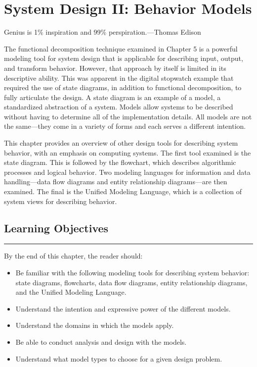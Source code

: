 \chapter{System Design II: Behavior Models}
\graphicspath{ {./chapter06/Fig} }

\begin{itquote}
Genius is 1\% inspiration and 99\% perspiration.---Thomas Edison
\end{itquote}


The functional decomposition technique examined in Chapter 5 is a
powerful modeling tool for system design that is applicable for
describing input, output, and transform behavior. However, that approach
by itself is limited in its descriptive ability. This was apparent in
the digital stopwatch example that required the use of state diagrams,
in addition to functional decomposition, to fully articulate the design.
A state diagram is an example of a model, a standardized abstraction of
a system. Models allow systems to be described without having to
determine all of the implementation details. All models are not the
same---they come in a variety of forms and each serves a different
intention.

This chapter provides an overview of other design tools for describing
system behavior, with an emphasis on computing systems. The first tool
examined is the state diagram. This is followed by the flowchart, which
describes algorithmic processes and logical behavior. Two modeling
languages for information and data handling---data flow diagrams and
entity relationship diagrams---are then examined. The final is the
Unified Modeling Language, which is a collection of system views for
describing behavior.

\section*{Learning Objectives}
\noindent\rule{\linewidth}{1pt}
By the end of this chapter, the reader should:

\begin{itemize}
\item
  Be familiar with the following modeling tools for describing system
  behavior: state diagrams, flowcharts, data flow diagrams, entity
  relationship diagrams, and the Unified Modeling Language.
\item
  Understand the intention and expressive power of the different models.
\item
  Understand the domains in which the models apply.
\item
  Be able to conduct analysis and design with the models.
\item
  Understand what model types to choose for a given design problem.
\end{itemize}

